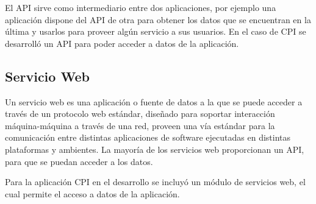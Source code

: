 El API sirve como intermediario entre dos aplicaciones, por ejemplo una aplicación dispone del API de otra para obtener los datos que se encuentran en la última y usarlos para proveer algún servicio a sus usuarios. En el caso de CPI se desarrolló un API para poder acceder a datos de la aplicación.

\subsection{Servicio Web}
Un servicio web es una aplicación o fuente de datos a la que se puede acceder a través de un protocolo web estándar, diseñado para soportar interacción máquina-máquina a través de una red, proveen una vía estándar para la comunicación entre distintas aplicaciones de software ejecutadas en distintas plataformas y ambientes. La mayoría de los servicios web proporcionan un API, para que se puedan acceder a los datos. \cite{webServiceChristensson}

Para la aplicación CPI en el desarrollo se incluyó un módulo de servicios web, el cual permite el acceso a datos de la aplicación.
